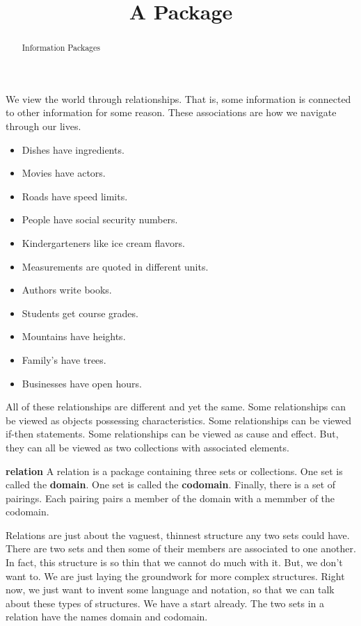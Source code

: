 \documentclass{ximera}
\title{A Package}
\begin{document}
\begin{abstract}
Information Packages
\end{abstract}
\maketitle


We view the world through relationships. That is, some information is connected to other information for some reason. These associations are how we navigate through our lives.

\begin{itemize}
\item Dishes have ingredients.
\item Movies have actors.
\item Roads have speed limits.
\item People have social security numbers.
\item Kindergarteners like ice cream flavors.
\item Measurements are quoted in different units.
\item Authors write books.
\item Students get course grades.
\item Mountains have heights.
\item Family's have trees.
\item Businesses have open hours.
\end{itemize}


All of these relationships are different and yet the same.  Some relationships can be viewed as objects possessing characteristics. Some relationships can be viewed if-then statements.  Some relationships can be viewed as cause and effect. But, they can all be viewed as two collections with associated elements.







\begin{definition} \textbf{relation} 
A relation is a package containing three sets or collections. One set is called the \textbf{domain}. One set is called the \textbf{codomain}.  Finally, there is a set of pairings.  Each pairing pairs a member of the domain with a memmber of the codomain.
\end{definition}


Relations are just about the vaguest, thinnest structure any two sets could have. There are two sets and then some of their members are associated to one another. In fact, this structure is so thin that we cannot do much with it.  But, we don't want to.  We are just laying the groundwork for more complex structures.  Right now, we just want to invent some language and notation, so that we can talk about these types of structures. We have a start already. The two sets in a relation have the names domain and codomain.
\end{document}
